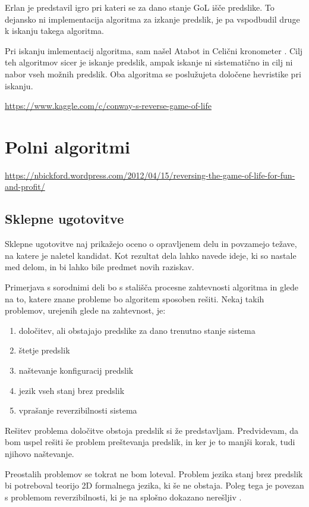 \documentclass[12pt,a4paper,openany,twoside]{book}
\begin{document}
Erlan \cite{Erlan2012} je predstavil igro pri kateri se za dano stanje
GoL išče predslike. To dejansko ni implementacija algoritma za izkanje predslik,
je pa vspodbudil druge k iskanju takega algoritma.

Pri iskanju imlementacij algoritma, sam našel Atabot \cite{Borah2013} in
Celični kronometer \cite{Duxbury2013}. Cilj teh algoritmov sicer je iskanje
predslik, ampak iskanje ni sistematično in cilj ni nabor vseh možnih predslik.
Oba algoritma se poslužujeta določene hevristike pri iskanju.

\url{https://www.kaggle.com/c/conway-s-reverse-game-of-life}

\section{Polni algoritmi}

\url{https://nbickford.wordpress.com/2012/04/15/reversing-the-game-of-life-for-fun-and-profit/}

\subsection{Sklepne ugotovitve}

Sklepne ugotovitve naj prikažejo oceno o opravljenem delu in povzamejo težave, na katere je naletel kandidat. Kot rezultat dela
lahko navede ideje, ki so nastale med delom, in bi lahko bile predmet novih raziskav.

Primerjava s sorodnimi deli bo s stališča procesne zahtevnosti algoritma in glede na to,
katere znane probleme bo algoritem sposoben rešiti. Nekaj takih problemov, urejenih glede na zahtevnost, je:
\begin{enumerate}
\item določitev, ali obstajajo predslike za dano trenutno stanje sistema
\item štetje predslik
\item naštevanje konfiguracij predslik
\item jezik vseh stanj brez predslik
\item vprašanje reverzibilnosti sistema
\end{enumerate}

Rešitev problema določitve obstoja predslik si že predstavljam. 
Predvidevam, da bom uspel rešiti še problem preštevanja predslik,
in ker je to manjši korak, tudi njihovo naštevanje.

Preostalih problemov se tokrat ne bom loteval.
Problem jezika stanj brez predslik bi potreboval teorijo 2D formalnega jezika, ki še ne obstaja.
Poleg tega je povezan s problemom reverzibilnosti, ki je na splošno dokazano nerešljiv \cite{Kari1989}.
\end{document}
